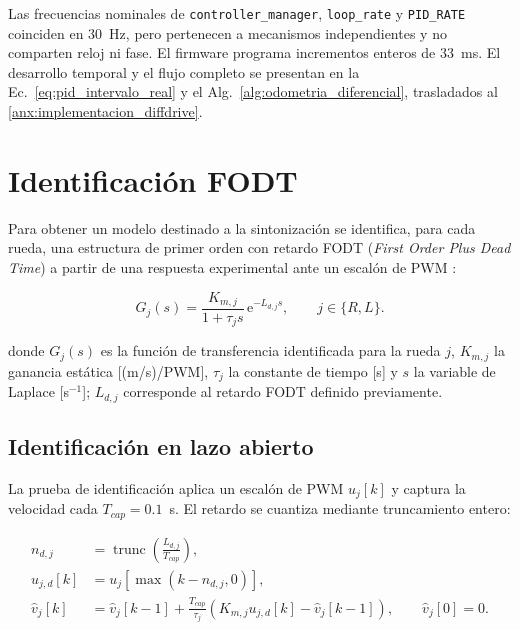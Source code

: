 Las frecuencias nominales de \texttt{controller\_manager},
\texttt{loop\_rate} y \texttt{PID\_RATE} coinciden en 30~Hz, pero pertenecen
a mecanismos independientes y no comparten reloj ni fase. El firmware programa
incrementos enteros de 33~ms. El desarrollo temporal y el flujo completo se
presentan en la Ec.~\eqref{eq:pid_intervalo_real} y el
Alg.~\ref{alg:odometria_diferencial}, trasladados al
\ref{anx:implementacion_diffdrive}.

\section{Identificación FODT}
\label{sec:fodt}

Para obtener un modelo destinado a la sintonización se identifica, para cada rueda, una estructura de primer orden con retardo FODT (\textit{First Order Plus Dead Time}) a partir de una respuesta experimental ante un escalón de PWM \citep{maxim2023fopdt}:

\begin{equation}
G_j(s)
=
\frac{K_{m,j}}{1+\tau_j s}\,
\mathrm{e}^{-L_{d,j}s},
\qquad j\in\{R,L\}.
\label{eq:fodt}
\end{equation}

\noindent donde $G_j(s)$ es la función de transferencia identificada para la rueda $j$, $K_{m,j}$ la ganancia estática [(m/s)/PWM], $\tau_j$ la constante de tiempo [s] y $s$ la variable de Laplace [s$^{-1}$]; $L_{d,j}$ corresponde al retardo FODT definido previamente.

\subsection{Identificación en lazo abierto}

La prueba de identificación aplica un escalón de PWM $u_j[k]$ y captura la velocidad cada $T_{cap}=0.1$~s. El retardo se cuantiza mediante truncamiento entero:

\begin{align}
n_{d,j}
&=
\operatorname{trunc}\left(\frac{L_{d,j}}{T_{cap}}\right),
\label{eq:retardo_muestras}\\
u_{j,d}[k]
&=
u_j\!\left[\max(k-n_{d,j},0)\right],
\label{eq:entrada_retrasada}\\
\widehat{v}_j[k]
&=
\widehat{v}_j[k-1]
+
\frac{T_{cap}}{\tau_j}
\left(
K_{m,j}u_{j,d}[k]-\widehat{v}_j[k-1]
\right),
\qquad \widehat{v}_j[0]=0.
\label{eq:fodt_discreto}
\end{align}

